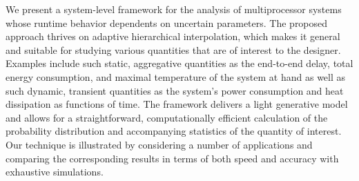 We present a system-level framework for the analysis of multiprocessor systems
whose runtime behavior dependents on uncertain parameters. The proposed approach
thrives on adaptive hierarchical interpolation, which makes it general and
suitable for studying various quantities that are of interest to the designer.
Examples include such static, aggregative quantities as the end-to-end delay,
total energy consumption, and maximal temperature of the system at hand as well
as such dynamic, transient quantities as the system's power consumption and heat
dissipation as functions of time. The framework delivers a light generative
model and allows for a straightforward, computationally efficient calculation of
the probability distribution and accompanying statistics of the quantity of
interest. Our technique is illustrated by considering a number of applications
and comparing the corresponding results in terms of both speed and accuracy with
exhaustive simulations.

